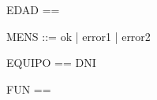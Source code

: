 \documentclass{article}
\begin{document}
\begin{zed}
 [DNI] 
\end{zed}




\begin{zed}
  EDAD == \nat
\end{zed}


\begin{zed} 
    MENS ::= ok | error1 | error2
\end{zed}


\begin{zed}
  EQUIPO == \power DNI
\end{zed}


\begin{zed}
  FUN == \nat \rel \nat
\end{zed}
\end{document}
